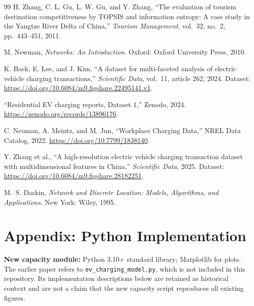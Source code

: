 \documentclass[12pt]{article}
\begin{document}
\begin{thebibliography}{99}
H. Zhang, C. L. Gu, L. W. Gu, and Y. Zhang,
``The evaluation of tourism destination competitiveness by TOPSIS and information entropy:
A case study in the Yangtze River Delta of China,''
\emph{Tourism Management}, vol.~32, no.~2, pp.~443--451, 2011.

M. Newman,
\emph{Networks: An Introduction}.
Oxford: Oxford University Press, 2010.

K. Baek, E. Lee, and J. Kim,
``A dataset for multi-faceted analysis of electric vehicle charging transactions,''
\emph{Scientific Data}, vol.~11, article 262, 2024.
Dataset: \url{https://doi.org/10.6084/m9.figshare.22495141.v1}.

``Residential EV charging reports, Dataset 1,'' Zenodo, 2024.
\url{https://zenodo.org/records/13896176}.

C. Neuman, A. Meintz, and M. Jun,
``Workplace Charging Data,'' NREL Data Catalog, 2022.
\url{https://doi.org/10.7799/1838140}.

Y. Zhang et al.,
``A high-resolution electric vehicle charging transaction dataset with multidimensional
features in China,'' \emph{Scientific Data}, 2025.
Dataset: \url{https://doi.org/10.6084/m9.figshare.28182251}.

M.~S. Daskin, \emph{Network and Discrete Location: Models, Algorithms, and Applications}.
New York: Wiley, 1995.

\end{thebibliography}

\newpage

\section*{Appendix: Python Implementation}

\textbf{New capacity module:} Python 3.10+ standard library; Matplotlib for plots.
The earlier paper refers to \texttt{ev\_charging\_model.py}, which is not included
in this repository. Its implementation descriptions below are retained as historical
context and are not a claim that the new capacity script reproduces all existing figures.

\vspace{4pt}
\end{document}
